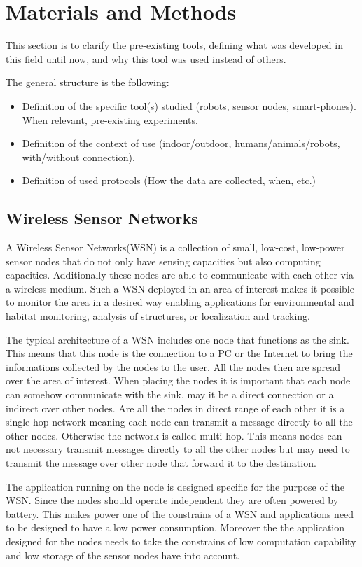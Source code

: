 \chapter{Materials and Methods}

This section is to clarify the pre-existing tools, defining what was developed in this field until now, and why this tool was used instead of others.

The general structure is the following:
\begin{itemize}
	\item Definition of the specific tool(s) studied (robots, sensor nodes, smart-phones). When relevant, pre-existing experiments.
	\item Definition of the context of use (indoor/outdoor, humans/animals/robots, with/without connection).
	\item Definition of used protocols (How the data are collected, when, etc.)
\end{itemize}

\section{Wireless Sensor Networks}
A Wireless Sensor Networks(WSN) is a collection of small, low-cost, low-power sensor nodes that do not only have sensing capacities but also computing capacities. Additionally these nodes are able to communicate with each other via a wireless medium. Such a WSN deployed in an area of interest makes it possible to monitor the area in a desired way enabling applications for environmental and habitat monitoring, analysis of structures, or localization and tracking.

The typical architecture of a WSN includes one node that functions as the sink. This means that this node is the connection to a PC or the Internet to bring the informations collected by the nodes to the user. All the nodes then are spread over the area of interest. When placing the nodes it is important that each node can somehow communicate with the sink, may it be a direct connection or a indirect over other nodes. Are all the nodes in direct range of each other it is a single hop network meaning each node can transmit a message directly to all the other nodes. Otherwise the network is called multi hop. This means nodes can not necessary transmit messages directly to all the other nodes but may need to transmit the message over other node that forward it to the destination.

The application running on the node is designed specific for the purpose of the WSN. Since the nodes should operate independent they are often powered by battery. This makes power one of the constrains of a WSN and applications need to be designed to have a low power consumption. Moreover the the application designed for the nodes needs to take the constrains of low computation capability and low storage of the sensor nodes have into account.   

